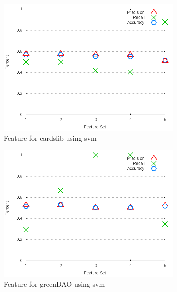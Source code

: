 \begin{figure}[!t]
\centering
\includegraphics[width=0.8\textwidth]{images/svm/test_3/cardslib_sample_range.png}
\caption{Feature for cardslib using \gls{svm}}
\label{fig:test_3_cardslib_svm}
\end{figure}

\begin{figure}[!t]
\centering
\includegraphics[width=0.8\textwidth]{images/svm/test_3/greenDAO_sample_range.png}
\caption{Feature for greenDAO using \gls{svm}}
\label{fig:test_3_greenDAO_svm}
\end{figure}

